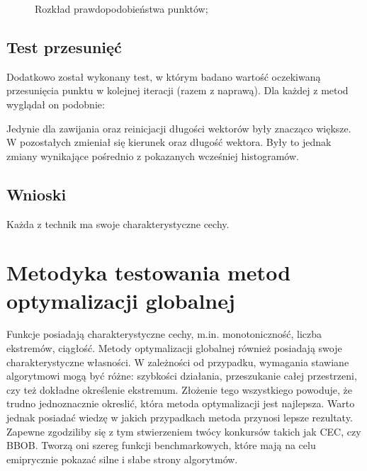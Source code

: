 \documentclass{mini}
\begin{document}
\begin{figure}[H]
\centering
{}
\quad
{}
\caption{Rozkład prawdopodobieństwa punktów;}
\end{figure}

\subsection{Test przesunięć}
Dodatkowo został wykonany test, w którym badano wartość oczekiwaną przesunięcia punktu w kolejnej iteracji (razem z naprawą). Dla każdej z metod wyglądał on podobnie:

Jedynie dla zawijania oraz reinicjacji długości wektorów były znacząco większe. W pozostałych zmieniał się kierunek oraz długość wektora. Były to jednak zmiany wynikające pośrednio z pokazanych wcześniej histogramów.

\subsection{Wnioski}
Każda z technik ma swoje charakterystyczne cechy.

\pagebreak

\section{Metodyka testowania metod optymalizacji globalnej}
Funkcje posiadają charakterystyczne cechy, m.in. monotoniczność, liczba ekstremów, ciągłość. Metody optymalizacji globalnej również posiadają swoje charakterystyczne własności. W zależności od przypadku, wymagania stawiane algorytmowi mogą być różne: szybkości działania, przeszukanie całej przestrzeni, czy też dokładne określenie ekstremum. Złożenie tego wszystkiego powoduje, że trudno jednoznacznie okreslić, która metoda optymalizacji jest najlepsza. Warto jednak posiadać wiedzę w jakich przypadkach metoda przynosi lepsze rezultaty.\\
Zapewne zgodziliby się z tym stwierzeniem twócy konkursów takich jak CEC, czy BBOB. Tworzą oni szereg funkcji benchmarkowych, które mają na celu emiprycznie pokazać silne i słabe strony algorytmów.
\end{document}
